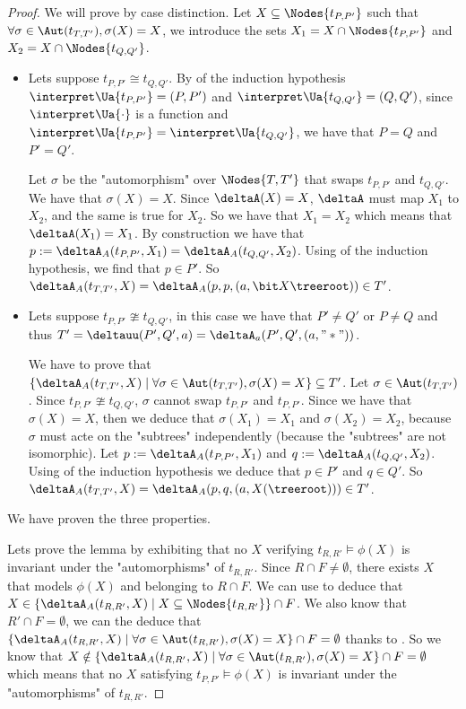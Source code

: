\documentclass[a4paper,UKenglish,cleveref, autoref, thm-restate]{lipics-v2021}
\begin{document}
\begin{proof}
	We will prove  by case distinction.
	Let $X \subseteq \Nodes {t_{P,P'}}$ such that $\forall \sigma \in \Aut (t_{T,T'}), \sigma(X) = X$, we introduce the
	sets $X_1 = X \cap \Nodes {t_{P,P'}}$ and $X_2 = X \cap \Nodes {t_{Q,Q'}}$.
	\begin{itemize}
		\item Lets suppose $t_{P,P'} \cong t_{Q,Q'}$.
		      By  of the induction hypothesis
		      $\interpret \Ua {t_{P,P'}} = (P,P')$ and $\interpret \Ua {t_{Q,Q'}} = (Q,Q')$, since $\interpret \Ua {\cdot}$ is a function
		      and $\interpret \Ua {t_{P,P'}} = \interpret \Ua {t_{Q,Q'}}$, we have that $P = Q$ and $P' = Q'$.

		      Let $\sigma$ be the "automorphism" over $\Nodes{T,T'}$ that swaps  $t_{P,P'}$ and $t_{Q,Q'}$.
		      We have that $\sigma (X) = X$. Since $\deltaA(X) = X$, $\deltaA$ must map $X_1$ to $X_2$, and the same is true for
		      $X_2$. So we have that $X_1 = X_2$ which means that $\deltaA(X_1) = X_1$. By construction we have that $p := \deltaA_A(t_{P,P'}, X_1) =  \deltaA_A(t_{Q,Q'}, X_2)$.
		      Using  of the induction hypothesis, we find that $p \in P'$. So
		      $\deltaA_A (t_{T,T'}, X) = \deltaA_A(p,p,(a, \bit X {\treeroot})) \in T'$.

		\item Lets suppose $t_{P,P'} \ncong t_{Q,Q'}$, in this case we have that $P' \neq Q'$ or $P \neq Q$ and thus $T' = \deltauu (P',Q',a) = \deltaA_a(P',Q',(a,"*"))$.

		      We have to prove that
		      $\{ \deltaA_A (t_{T,T'},X) \mid \forall \sigma \in \Aut(t_{T,T'}), \sigma(X) = X\} \subseteq T'$.
		      Let $\sigma \in \Aut(t_{T,T'})$. Since $t_{P,P'} \ncong t_{Q,Q'}$, $\sigma$ cannot swap $t_{P,P'}$ and
		      $t_{P,P'}$.
		      Since we have that $\sigma(X) = X$, then we deduce that $\sigma(X_1) = X_1$ and
		      $\sigma(X_2) = X_2$, because $\sigma$ must acte on the "subtrees" independently (because the "subtrees" are not isomorphic).
		      Let $p := \deltaA_A (t_{P,P'}, X_1)$ and $q := \deltaA_A (t_{Q,Q'}, X_2)$.
		      Using  of the induction hypothesis we deduce that $p \in P'$ and $q \in Q'$.
		      So $\deltaA_A (t_{T,T'}, X) = \deltaA_A(p,q,(a, X(\treeroot))) \in T'$.
	\end{itemize}
	We have proven the three properties.

	Lets prove the lemma by exhibiting that no $X$ verifying $t_{R,R'} \models \phi(X)$ is invariant under the "automorphisms" of $t_{R,R'}$.
	Since $R \cap F \neq \emptyset$, there exists $X$ that models $\phi(X)$ and  belonging to $R \cap F$. We can use  to deduce that
	$X \in \{ \deltaA_A (t_{R,R'},X) \mid X \subseteq \Nodes {t_{R,R'}}\} \cap F$.
	We also know that $R' \cap F = \emptyset$, we can the deduce that $\{ \deltaA_A (t_{R,R'},X) \mid \forall \sigma \in \Aut(t_{R,R'}), \sigma(X) = X\} \cap F = \emptyset$
	thanks to . So we know that $X \notin \{ \deltaA_A (t_{R,R'},X) \mid \forall \sigma \in \Aut(t_{R,R'}), \sigma(X) = X\} \cap F = \emptyset$ which means that no
	$X$ satisfying $t_{P,P'} \models \phi(X)$ is invariant under the "automorphisms" of $t_{R,R'}$.
\end{proof}
\end{document}
